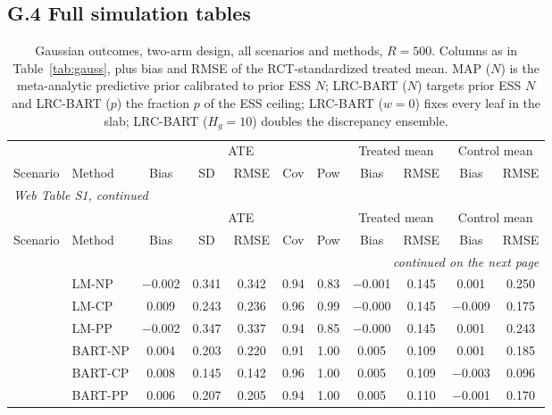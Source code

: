 \documentclass[11pt]{article}
\theoremstyle{definition}
\theoremstyle{plain}
\begin{document}
\subsection*{G.4 Full simulation tables}

\begin{center}
\scriptsize
\setlength{\tabcolsep}{3.5pt}
\renewcommand{\arraystretch}{0.8}
\begin{longtable}{llccccccccc}
\caption{Gaussian outcomes, two-arm design, all scenarios and methods, $R=500$. Columns as in Table~\ref{tab:gauss}, plus bias and RMSE of the RCT-standardized treated mean. MAP ($N$) is the meta-analytic predictive prior calibrated to prior ESS $N$; LRC-BART ($N$) targets prior ESS $N$ and LRC-BART ($p$) the fraction $p$ of the ESS ceiling; LRC-BART ($w=0$) fixes every leaf in the slab; LRC-BART ($H_g=10$) doubles the discrepancy ensemble.}\label{tab:gauss_full}\\
\toprule
& & \multicolumn{5}{c}{ATE} & \multicolumn{2}{c}{Treated mean} & \multicolumn{2}{c}{Control mean} \\
\cmidrule(lr){3-7}\cmidrule(lr){8-9}\cmidrule(lr){10-11}
Scenario & Method & Bias & SD & RMSE & Cov & Pow & Bias & RMSE & Bias & RMSE \\
\midrule
\endfirsthead
\multicolumn{11}{l}{\textit{Web Table S1, continued}}\\
\toprule
& & \multicolumn{5}{c}{ATE} & \multicolumn{2}{c}{Treated mean} & \multicolumn{2}{c}{Control mean} \\
\cmidrule(lr){3-7}\cmidrule(lr){8-9}\cmidrule(lr){10-11}
Scenario & Method & Bias & SD & RMSE & Cov & Pow & Bias & RMSE & Bias & RMSE \\
\midrule
\endhead
\midrule
\multicolumn{11}{r}{\textit{continued on the next page}}\\
\endfoot
\bottomrule
\endlastfoot
\multirow{20}{*}{Sc1} & LM-NP & $-$0.002 & 0.341 & 0.342 & 0.94 & 0.83 & $-$0.001 & 0.145 & 0.001 & 0.250 \\
& LM-CP & 0.009 & 0.243 & 0.236 & 0.96 & 0.99 & $-$0.000 & 0.145 & $-$0.009 & 0.175 \\
& LM-PP & $-$0.002 & 0.347 & 0.337 & 0.94 & 0.85 & $-$0.000 & 0.145 & 0.001 & 0.243 \\
& BART-NP & 0.004 & 0.203 & 0.220 & 0.91 & 1.00 & 0.005 & 0.109 & 0.001 & 0.185 \\
& BART-CP & 0.008 & 0.145 & 0.142 & 0.96 & 1.00 & 0.005 & 0.109 & $-$0.003 & 0.096 \\
& BART-PP & 0.006 & 0.207 & 0.205 & 0.94 & 1.00 & 0.005 & 0.110 & $-$0.001 & 0.170 \\

\end{longtable}
\end{center}
\end{document}
